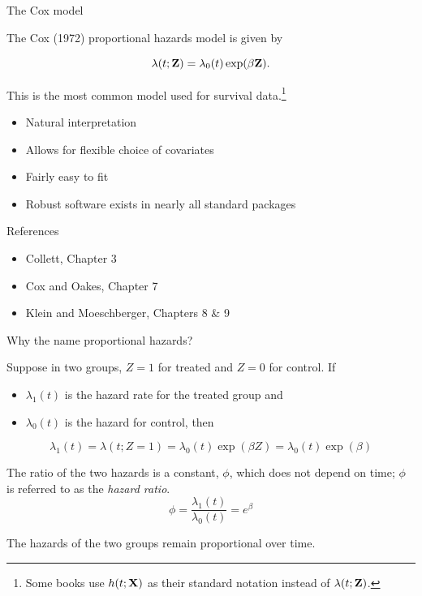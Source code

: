 \documentclass[ignorenonframetext,]{beamer}
\begin{document}
\begin{frame}{%
\protect\hypertarget{the-cox-model}{%
The Cox model}}

The Cox (1972) proportional hazards model is given by

\[\lambda(t;{\bf Z}) = \lambda_0(t) \exp(\beta {\bf Z}).\]

This is the most common model used for survival
data.\footnote{Some books use $h(t;{\bf X})$ as their standard notation
instead of $\lambda(t;{\bf Z})$.}

\begin{itemize}
\item
  Natural interpretation
\item
  Allows for flexible choice of covariates
\item
  Fairly easy to fit
\item
  Robust software exists in nearly all standard packages
\end{itemize}

\small

References

\begin{itemize}
\item
  Collett, Chapter 3
\item
  Cox and Oakes, Chapter 7
\item
  Klein and Moeschberger, Chapters 8 \& 9
\end{itemize}

\end{frame}

\begin{frame}{%
\protect\hypertarget{why-the-name-proportional-hazards}{%
Why the name proportional hazards?}}

Suppose in two groups, \(Z=1\) for treated and \(Z=0\) for control. If

\begin{itemize}
\item
  \(\lambda_1(t)\) is the hazard rate for the treated group and
\item
  \(\lambda_0(t)\) is the hazard for control, then
\end{itemize}

\[ \lambda_1(t) = \lambda(t;Z=1) = \lambda_0(t) \exp(\beta Z) = \lambda_0(t) \exp(\beta)\]

The ratio of the two hazards is a constant, \(\phi\), which does not
depend on time; \(\phi\) is referred to as the \emph{hazard ratio}.
\[\phi = \frac{\lambda_1(t)}{\lambda_0(t)} = e^{\beta} \]

The hazards of the two groups remain proportional over time.

\end{frame}
\end{document}
